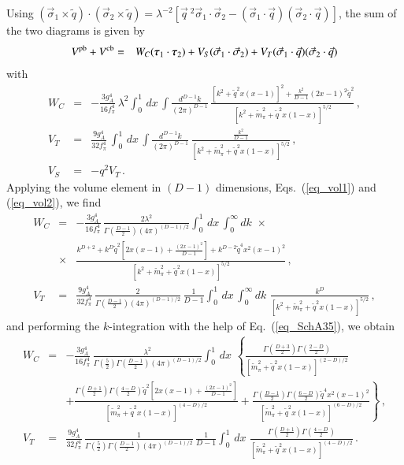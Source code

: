 \documentclass[sort&compress,preprint,3p]{elsarticle}
\begin{document}
%
Using $(\vec \sigma_1 \times \tilde q) \cdot (\vec \sigma_2 \times \tilde q)=
\lambda^{-2} [\vec q~^2 \vec \sigma_1\cdot \vec \sigma_2 -
(\vec \sigma_1\cdot\vec q)(\vec \sigma_2\cdot\vec q)]$, the sum of the
two diagrams is given by
%
\begin{eqnarray}
V^{\rm pb} + V^{\rm cb} &=& W_C  
(\mbox{\boldmath $\tau$}_1 \cdot \mbox{\boldmath $\tau$}_2) +
V_S (\vec \sigma_1 \cdot \vec \sigma_2)  
+ V_T 
(\vec \sigma_1\cdot\vec q)(\vec \sigma_2\cdot\vec q) 
\end{eqnarray}
%
with 
%
\begin{eqnarray}
W_C &=& -\frac{3g_A^4}{16 f_\pi^4} \,
\lambda^{2}
\int_0^1\, dx\,\int \frac{d^{D-1} k}{(2\pi)^{D-1}} \, 
\frac{[k^2+\tilde q^2x(x-1)]^2+\frac{k^2}{D-1}(2x-1)^2\tilde q^2}
{[k^2+\tilde m_\pi^2+\tilde q^2 x(1-x)]^{5/2}}
\,,
\\
V_T &=& \frac{9g_A^4}{32 f_\pi^4} \,
\int_0^1\, dx\,\int \frac{d^{D-1} k}{(2\pi)^{D-1}} \,
\frac{\frac{k^2}{D-1}}
{[k^2+\tilde m_\pi^2+\tilde q^2 x(1-x)]^{5/2}}
\,,
\\
V_S &=& -q^2 V_T
\,.
\end{eqnarray}
%
Applying the volume element in $(D-1)$ dimensions, Eqs.~(\ref{eq_vol1})
and (\ref{eq_vol2}), we find
%
\begin{eqnarray}
W_C &=& -\frac{3g_A^4}{16 f_\pi^4} \,
\frac{2\lambda^{2}}{\Gamma(\frac{D-1}{2}) (4 \pi)^{(D-1)/2}}
\int_0^1\, dx\,\int_0^\infty dk \,\,
\times \nonumber \\ &\times&
\frac{k^{D+2}+k^D \tilde q^2 \left[ 2x(x-1)+ \frac{(2x-1)^2}{D-1} \right]+
k^{D-2}\tilde q^4x^2(x-1)^2}
{[k^2+\tilde m_\pi^2+\tilde q^2 x(1-x)]^{5/2}}
\,,
\\
V_T &=& \frac{9g_A^4}{32 f_\pi^4} \,
\frac{2}{\Gamma(\frac{D-1}{2}) (4 \pi)^{(D-1)/2}}
\, \frac{1}{D-1}
\int_0^1\, dx\,\int_0^\infty dk \, \,
\frac{k^D}
{[k^2+\tilde m_\pi^2+\tilde q^2 x(1-x)]^{5/2}}
\,,
\end{eqnarray}
%
and performing the $k$-integration with the help of Eq.~(\ref{eq_SchA35}),
we obtain
%
\begin{eqnarray}
W_C &=& -\frac{3g_A^4}{16 f_\pi^4} \,
\frac{\lambda^{2}}{\Gamma(\frac{5}{2})\Gamma(\frac{D-1}{2}) (4 \pi)^{(D-1)/2}}
\int_0^1\, dx\,\, \left\{
\frac{\Gamma(\frac{D+3}{2})\Gamma(\frac{2-D}{2})}
{[\tilde m_\pi^2+\tilde q^2 x(1-x)]^{(2-D)/2}}
\right . \nonumber \\ && \left.
+\frac{\Gamma(\frac{D+1}{2})\Gamma(\frac{4-D}{2})
\tilde q^2 \left[ 2x(x-1)+ \frac{(2x-1)^2}{D-1} \right]}
{[\tilde m_\pi^2+\tilde q^2 x(1-x)]^{(4-D)/2}}
+\frac{\Gamma(\frac{D-1}{2})\Gamma(\frac{6-D}{2})
\tilde q^4x^2(x-1)^2}
{[\tilde m_\pi^2+\tilde q^2 x(1-x)]^{(6-D)/2}}
\right\}
\,,
\\
V_T &=& \frac{9g_A^4}{32 f_\pi^4} \,
\frac{1}{\Gamma(\frac{5}{2})\Gamma(\frac{D-1}{2}) (4 \pi)^{(D-1)/2}}
\, \frac{1}{D-1}
\int_0^1\, dx\,\,
\frac{\Gamma(\frac{D+1}{2})\Gamma(\frac{4-D}{2})}
{[\tilde m_\pi^2+\tilde q^2 x(1-x)]^{(4-D)/2}}
\,.
\end{eqnarray}
\end{document}
